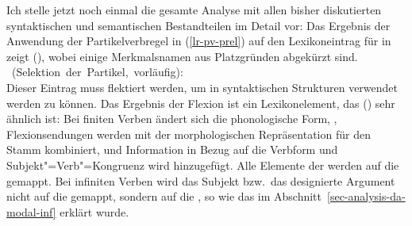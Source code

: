 \noindent
Ich stelle jetzt noch einmal die gesamte Analyse mit allen bisher diskutierten syntaktischen
und semantischen Bestandteilen im Detail vor: Das Ergebnis der Anwendung der Partikelverbregel in (\ref{lr-pv-prel})
auf den Lexikoneintrag für  in  zeigt (), wobei einige
Merkmalsnamen aus Platzgründen abgekürzt sind.
%
%
\eas
\label{le-lach-+particle-prel}%
\mbox{ (Selektion der Partikel, vorläufig):}\\
\zs
%
Dieser Eintrag muss flektiert werden, um in syntaktischen Strukturen verwendet werden zu können.
Das Ergebnis der Flexion ist ein Lexikonelement, das () sehr ähnlich ist: Bei finiten
Verben ändert sich die phonologische Form, \dash, Flexionsendungen werden mit der morphologischen
Repräsentation für den Stamm kombiniert, und Information in Bezug auf die Verbform und Subjekt"=Verb"=Kongruenz
wird hinzugefügt. Alle Elemente der \argstl werden auf die \compsl gemappt. Bei infiniten Verben wird das Subjekt bzw.\ das designierte Argument
nicht auf die \compsl gemappt, sondern auf die \subjl, so wie das im Abschnitt~\ref{sec-analysis-da-modal-inf} erklärt wurde.
\largerpage[-1]
 
